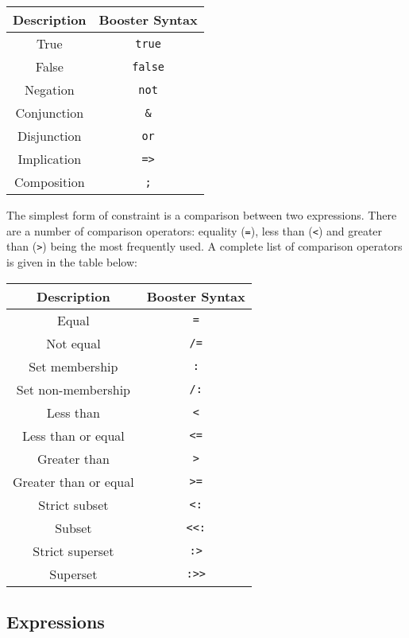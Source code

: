 \begin{center}
  \begin{tabular} { | c | c | } 
  \hline
  \textbf{Description} & \textbf{Booster Syntax} \\ \hline
  True & \verb|true| \\ \hline
  False & \verb|false| \\ \hline
  Negation & \verb|not| \\ \hline
  Conjunction & \verb|&| \\ \hline
  Disjunction & \verb|or| \\ \hline
  Implication & \verb|=>| \\ \hline
  Composition & \verb|;| \\ \hline
  \end{tabular}
\end{center}
The simplest form of constraint is a comparison between two
expressions.  There are a number of comparison operators: equality
(\verb|=|), less than (\verb|<|) and greater than (\verb|>|) being the
most frequently used.  A complete list of comparison operators is
given in the table below:

\begin{center}
  \begin{tabular} { | c | c | } 
  \hline
  \textbf{Description} & \textbf{Booster Syntax} \\ \hline
  Equal & \verb|=| \\ \hline
  Not equal & \verb|/=| \\ \hline
  Set membership & \verb|:| \\ \hline
  Set non-membership & \verb|/:| \\ \hline
  Less than & \verb|<| \\ \hline
  Less than or equal & \verb|<=| \\ \hline
  Greater than & \verb|>| \\ \hline
  Greater than or equal & \verb|>=| \\ \hline
  Strict subset & \verb|<:| \\ \hline
  Subset & \verb|<<:| \\ \hline
  Strict superset & \verb|:>| \\ \hline
  Superset & \verb|:>>| \\ \hline
  \end{tabular}
\end{center}

\subsection{Expressions}

